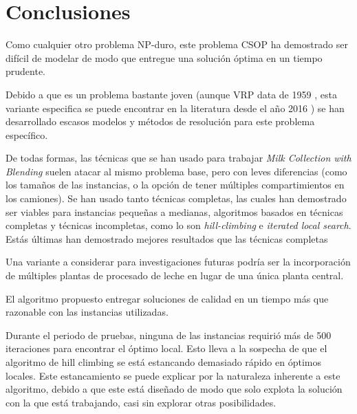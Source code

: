 \section{Conclusiones}

Como cualquier otro problema NP-duro, este problema CSOP ha demostrado ser difícil de modelar de modo que entregue una solución óptima en un tiempo prudente.

Debido a que es un problema bastante joven (aunque VRP data de 1959 \cite{TruckDispatchingProblem}, esta variante especifica se puede encontrar en la literatura desde el año 2016 \cite{MilkWithBlending}) se han desarrollado escasos modelos y métodos de resolución para este problema específico.

De todas formas, las técnicas que se han usado para trabajar \textit{Milk Collection with Blending} suelen atacar al mismo problema base, pero con leves diferencias (como los tamaños de las instancias, o la opción de tener múltiples compartimientos en los camiones). Se han usado tanto técnicas completas, las cuales han demostrado ser viables para instancias pequeñas a medianas, algoritmos basados en técnicas completas y técnicas incompletas, como lo son \textit{hill-climbing} e \textit{iterated local search}. Estás últimas han demostrado mejores resultados que las técnicas completas

Una variante a considerar para investigaciones futuras podría ser la incorporación de múltiples plantas de procesado de leche en lugar de una única planta central.




El algoritmo propuesto entregar soluciones de calidad en un tiempo más que razonable con las instancias utilizadas.

Durante el periodo de pruebas, ninguna de las instancias requirió más de 500 iteraciones para encontrar el óptimo local. Esto lleva a la sospecha de que el algoritmo de hill climbing se está estancando demasiado rápido en óptimos locales. Este estancamiento se puede explicar por la naturaleza inherente a este algoritmo, debido a que este está diseñado de modo que solo explota la solución con la que está trabajando, casi sin explorar otras posibilidades.

